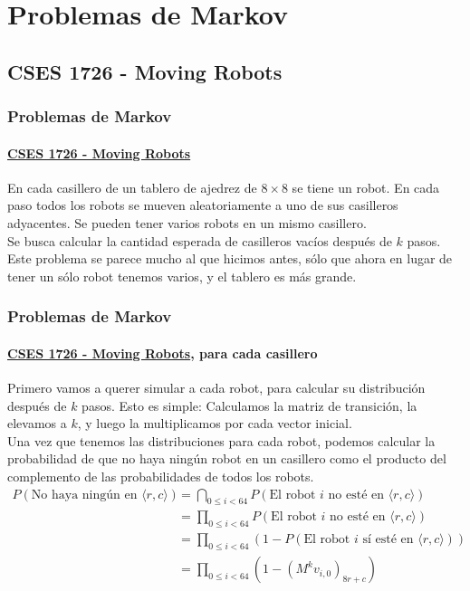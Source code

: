 \documentclass{beamer}
\begin{document}

\newcommand{\SECTIOND}{Problemas de Markov}
\section{\SECTIOND}

\newcommand{\EJD}{\href{https://cses.fi/problemset/view/1726/}{CSES 1726 - Moving Robots}}
\subsection{CSES 1726 - Moving Robots}

\begin{frame}
  \frametitle{\SECTIOND}
  \framesubtitle{\EJD}

  En cada casillero de un tablero de ajedrez de \(8 \times 8\) se tiene un robot. En cada paso todos los robots se mueven aleatoriamente a uno de sus casilleros adyacentes. Se pueden tener varios robots en un mismo casillero. \\
  Se busca calcular la cantidad esperada de casilleros vacíos después de \(k\) pasos. \pause \\
  Este problema se parece mucho al que hicimos antes, sólo que ahora en lugar de tener un sólo robot tenemos varios, y el tablero es más grande.
\end{frame}

\begin{frame}
  \frametitle{\SECTIOND}
  \framesubtitle{\EJD, para cada casillero}

  Primero vamos a querer simular a cada robot, para calcular su distribución después de \(k\) pasos. \pause Esto es simple: Calculamos la matriz de transición, la elevamos a \(k\), y luego la multiplicamos por cada vector inicial. \pause \\
  Una vez que tenemos las distribuciones para cada robot, podemos calcular la probabilidad de que no haya ningún robot en un casillero como el producto del complemento de las probabilidades de todos los robots. \pause
  \begin{align*}
    P(\text{No haya ningún en } \langle r, c \rangle) &= \bigcap_{0 \leq i < 64} P(\text{El robot } i \text{ no esté en } \langle r, c \rangle) \\
                                                      &= \prod_{0 \leq i < 64}P(\text{El robot } i \text{ no esté en } \langle r, c \rangle) \\
                                                      &= \prod_{0 \leq i < 64}(1 - P(\text{El robot } i \text{ sí esté en } \langle r, c \rangle)) \\
                                                      &= \prod_{0 \leq i < 64}(1 - (M^{k}v_{i,0})_{8r + c}) \\
  \end{align*}
\end{frame}
\end{document}
